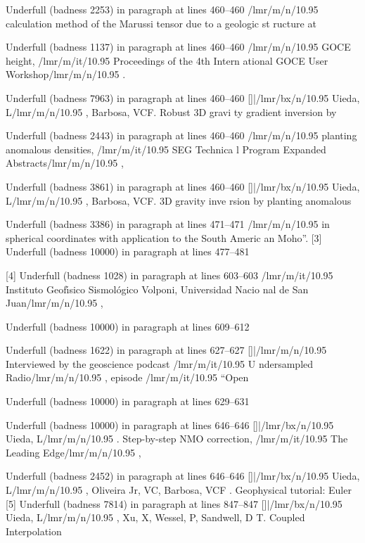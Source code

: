 \documentclass[11pt, a4paper]{article}
\begin{document}
Underfull \hbox (badness 2253) in paragraph at lines 460--460
\TU/lmr/m/n/10.95 calculation method of the Marussi tensor due to a geologic st
ructure at

Underfull \hbox (badness 1137) in paragraph at lines 460--460
\TU/lmr/m/n/10.95 GOCE height, \TU/lmr/m/it/10.95 Proceedings of the 4th Intern
ational GOCE User Workshop\TU/lmr/m/n/10.95 .

Underfull \hbox (badness 7963) in paragraph at lines 460--460
[]|\TU/lmr/bx/n/10.95 Uieda, L\TU/lmr/m/n/10.95 , Barbosa, VCF. Robust 3D gravi
ty gradient inversion by

Underfull \hbox (badness 2443) in paragraph at lines 460--460
\TU/lmr/m/n/10.95 planting anomalous densities, \TU/lmr/m/it/10.95 SEG Technica
l Program Expanded Abstracts\TU/lmr/m/n/10.95 ,

Underfull \hbox (badness 3861) in paragraph at lines 460--460
[]|\TU/lmr/bx/n/10.95 Uieda, L\TU/lmr/m/n/10.95 , Barbosa, VCF. 3D gravity inve
rsion by planting anomalous

Underfull \hbox (badness 3386) in paragraph at lines 471--471
\TU/lmr/m/n/10.95 in spherical coordinates with application to the South Americ
an Moho”.
[3]
Underfull \hbox (badness 10000) in paragraph at lines 477--481

[4]
Underfull \hbox (badness 1028) in paragraph at lines 603--603
\TU/lmr/m/it/10.95 Instituto Geofı́sico Sismológico Volponi, Universidad Nacio
nal de San Juan\TU/lmr/m/n/10.95 ,

Underfull \hbox (badness 10000) in paragraph at lines 609--612


Underfull \hbox (badness 1622) in paragraph at lines 627--627
[]|\TU/lmr/m/n/10.95 Interviewed by the geoscience podcast \TU/lmr/m/it/10.95 U
ndersampled Radio\TU/lmr/m/n/10.95 , episode \TU/lmr/m/it/10.95 “Open

Underfull \hbox (badness 10000) in paragraph at lines 629--631


Underfull \hbox (badness 10000) in paragraph at lines 646--646
[]|\TU/lmr/bx/n/10.95 Uieda, L\TU/lmr/m/n/10.95 . Step-by-step NMO correction, 
\TU/lmr/m/it/10.95 The Leading Edge\TU/lmr/m/n/10.95 ,

Underfull \hbox (badness 2452) in paragraph at lines 646--646
[]|\TU/lmr/bx/n/10.95 Uieda, L\TU/lmr/m/n/10.95 , Oliveira Jr, VC, Barbosa, VCF
. Geophysical tutorial: Euler
[5]
Underfull \hbox (badness 7814) in paragraph at lines 847--847
[]|\TU/lmr/bx/n/10.95 Uieda, L\TU/lmr/m/n/10.95 , Xu, X, Wessel, P, Sandwell, D
T. Coupled Interpolation
\end{document}
